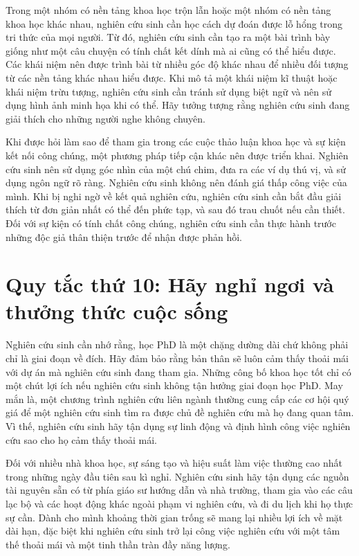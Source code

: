 \documentclass[12pt]{report}
\begin{document}
Trong một nhóm có nền tảng khoa học trộn lẫn hoặc một nhóm có nền tảng khoa học khác nhau, nghiên cứu sinh cần học cách dự đoán được lỗ hổng trong tri thức của mọi người. Từ đó, nghiên cứu sinh cần tạo ra một bài trình bày giống như một câu chuyện có tính chất kết dính mà ai cũng có thể hiểu được. Các khái niệm nên được trình bài từ nhiều góc độ khác nhau để nhiều đối tượng từ các nền tảng khác nhau hiểu được. Khi mô tả một khái niệm kĩ thuật hoặc khái niệm trừu tượng, nghiên cứu sinh cần tránh sử dụng biệt ngữ và nên sử dụng hình ảnh minh họa khi có thể. Hãy tưởng tượng rằng nghiên cứu sinh đang giải thích cho những người nghe không chuyên.

Khi được hỏi làm sao để tham gia trong các cuộc thảo luận khoa học và sự kiện kết nối công chúng, một phương pháp tiếp cận khác nên được triển khai. Nghiên cứu sinh nên sử dụng góc nhìn của một chú chim, đưa ra các ví dụ thú vị, và sử dụng ngôn ngữ rõ ràng. Nghiên cứu sinh không nên đánh giá thấp công việc của mình. Khi bị nghi ngờ về kết quả nghiên cứu, nghiên cứu sinh cần bắt đầu giải thích từ đơn giản nhất có thể đến phức tạp, và sau đó trau chuốt nếu cần thiết. Đối với sự kiện có tính chất công chúng, nghiên cứu sinh cần thực hành trước những độc giả thân thiện trước để nhận được phản hồi.

\section{Quy tắc thứ 10: Hãy nghỉ ngơi và thưởng thức cuộc sống}

Nghiên cứu sinh cần nhớ rằng, học PhD là một chặng dường dài chứ không phải chỉ là giai đoạn về đích. Hãy đảm bảo rằng bản thân sẽ luôn cảm thấy thoải mái với dự án mà nghiên cứu sinh đang tham gia. Những công bố khoa học tốt chỉ có một chút lợi ích nếu nghiên cứu sinh không tận hưởng giai đoạn học PhD. May mắn là, một chương trình nghiên cứu liên ngành thường cung cấp các cơ hội quý giá để một nghiên cứu sinh tìm ra được chủ đề nghiên cứu mà họ đang quan tâm. Vì thế, nghiên cứu sinh hãy tận dụng sự linh động và định hình công việc nghiên cứu sao cho họ cảm thấy thoải mái.

Đối với nhiều nhà khoa học, sự sáng tạo và hiệu suất làm việc thường cao nhất trong những ngày đầu tiên sau kì nghỉ. Nghiên cứu sinh hãy tận dụng các nguồn tài nguyên sẵn có từ phía giáo sư hướng dẫn và nhà trường, tham gia vào các câu lạc bộ và các hoạt động khác ngoài phạm vi nghiên cứu, và đi du lịch khi họ thực sự cần. Dành cho mình khoảng thời gian trống sẽ mang lại nhiều lợi ích về mặt dài hạn, đặc biệt khi nghiên cứu sinh trở lại công việc nghiên cứu với một tâm thế thoải mái và một tinh thần tràn đầy năng lượng.
\end{document}
